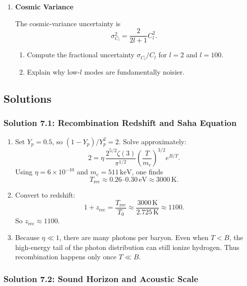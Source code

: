\begin{enumerate}[label=7.\arabic*]
  \item \label{q:7.4} \textbf{Cosmic Variance}
  
  The cosmic-variance uncertainty is
  \[
    \sigma_{C_l}^2 = \frac{2}{2l+1} C_l^2.
  \]
  \begin{enumerate}[label=(\alph*)]
    \item Compute the fractional uncertainty $\sigma_{C_l}/C_l$ for $l=2$ and $l=100$.
    \item Explain why low-$l$ modes are fundamentally noisier.
  \end{enumerate}
\end{enumerate}

\bigskip
\bigskip
\bigskip

\subsection{Solutions}

\subsubsection*{Solution 7.1: Recombination Redshift and Saha Equation}

\begin{enumerate}[label=(\alph*)]
  \item Set $Y_p=0.5$, so $(1-Y_p)/Y_p^2 = 2$. Solve approximately:
  \[
    2 = \eta\,\frac{2^{5/2}\zeta(3)}{\pi^{1/2}}
    \left(\frac{T}{m_e}\right)^{3/2} e^{B/T}.
  \]
  Using $\eta=6\times10^{-10}$ and $m_e=511\,\mathrm{keV}$, one finds
  \[
    T_{\mathrm{rec}} \approx 0.26\text{--}0.30\,\mathrm{eV} \approx 3000\,\mathrm{K}.
  \]

  \item Convert to redshift:
  \[
    1+z_{\mathrm{rec}}=\frac{T_{\mathrm{rec}}}{T_0}
    \approx \frac{3000\,\mathrm{K}}{2.725\,\mathrm{K}} \approx 1100.
  \]
  So $z_{\mathrm{rec}}\approx 1100$.

  \item Because $\eta\ll1$, there are many photons per baryon. Even when $T<B$, the high-energy tail
  of the photon distribution can still ionize hydrogen. Thus recombination happens only once
  $T\ll B$.
\end{enumerate}

\subsubsection*{Solution 7.2: Sound Horizon and Acoustic Scale}

